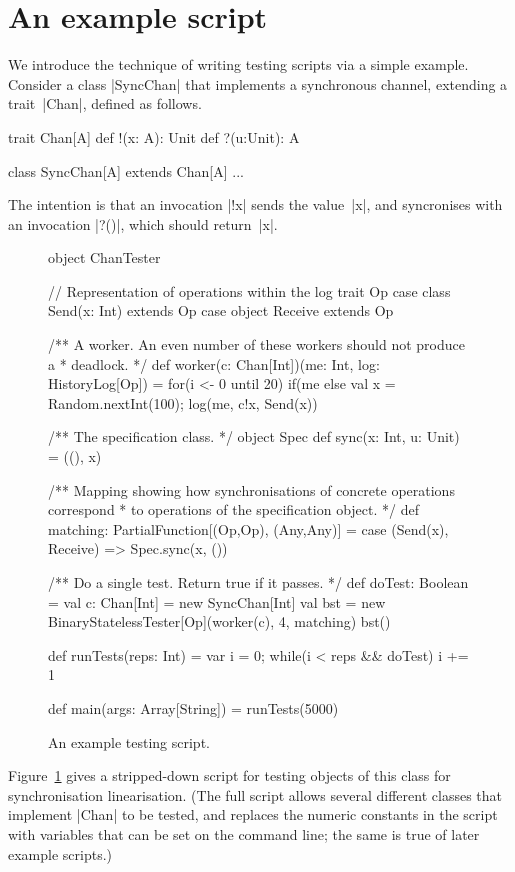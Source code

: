 
\section{An example script}

We introduce the technique of writing testing scripts via a simple example.
Consider a class |SyncChan| that implements a synchronous channel, extending a
trait~|Chan|, defined as follows.
%
\begin{scala}
trait Chan[A]{
  def !(x: A): Unit
  def ?(u:Unit): A
}

class SyncChan[A] extends Chan[A]{ ... }
\end{scala}
%
The intention is that an invocation |!x| sends the value~|x|, and syncronises
with an invocation |?()|, which should return~|x|.


\begin{figure}
\begin{scala}
object ChanTester{
  // Representation of operations within the log
  trait Op
  case class Send(x: Int) extends Op
  case object Receive extends Op

  /** A worker.  An even number of these workers should not produce a
    * deadlock. */
  def worker(c: Chan[Int])(me: Int, log: HistoryLog[Op]) = {
    for(i <- 0 until 20)
      if(me%
      else{ val x = Random.nextInt(100); log(me, c!x, Send(x)) }
  }

  /** The specification class. */
  object Spec{
    def sync(x: Int, u: Unit) = ((), x)
  } 

  /** Mapping showing how synchronisations of concrete operations correspond
    * to operations of the specification object. */
  def matching: PartialFunction[(Op,Op), (Any,Any)] = {
    case (Send(x), Receive) => Spec.sync(x, ()) 
  }

  /** Do a single test.  Return true if it passes. */
  def doTest: Boolean = {
    val c: Chan[Int] = new SyncChan[Int]
    val bst = new BinaryStatelessTester[Op](worker(c), 4, matching)
    bst()
  }

  def runTests(reps: Int) = {
    var i = 0; while(i < reps && doTest) i += 1
  }

  def main(args: Array[String]) = runTests(5000)
}
\end{scala}
\caption{An example testing script.\label{fig:script}}
\end{figure}


Figure~\ref{fig:script} gives a stripped-down script for testing objects of
this class for synchronisation linearisation.  (The full script allows several
different classes that implement |Chan| to be tested, and replaces the numeric
constants in the script with variables that can be set on the command line;
the same is true of later example scripts.)

